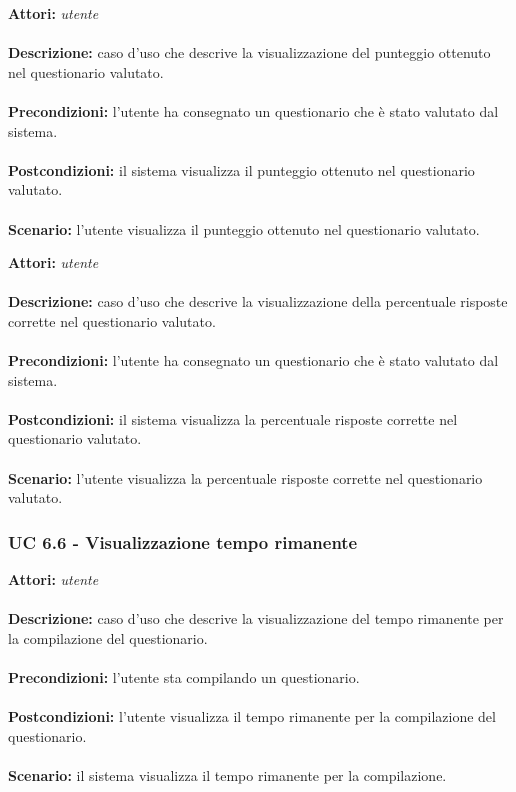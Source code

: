 \documentclass[a4paper,11pt]{article}
\begin{document}

\textbf{Attori:} \textit{utente}
\\ \\
\textbf{Descrizione:} caso d'uso che descrive la visualizzazione del punteggio ottenuto nel questionario valutato.\\
\\
\textbf{Precondizioni:} l'utente ha consegnato un questionario che è stato valutato dal sistema.\\
\\
\textbf{Postcondizioni:} il sistema visualizza il punteggio ottenuto nel questionario valutato.\\
\\
\textbf{Scenario:} l’utente visualizza il punteggio ottenuto nel questionario valutato.\\



\textbf{Attori:} \textit{utente}
\\ \\
\textbf{Descrizione:} caso d'uso che descrive la visualizzazione della percentuale risposte corrette nel questionario valutato.\\
\\
\textbf{Precondizioni:} l'utente ha consegnato un questionario che è stato valutato dal sistema.\\
\\
\textbf{Postcondizioni:} il sistema visualizza la percentuale risposte corrette nel questionario valutato.\\
\\
\textbf{Scenario:} l’utente visualizza la percentuale risposte corrette nel questionario valutato.\\


\subsubsection{UC 6.6 - Visualizzazione tempo rimanente}

\textbf{Attori:} \textit{utente}
\\ \\
\textbf{Descrizione:} caso d'uso che descrive la visualizzazione del tempo rimanente per la compilazione del questionario.\\
\\
\textbf{Precondizioni:} l'utente sta compilando un questionario.\\
\\
\textbf{Postcondizioni:} l'utente visualizza il tempo rimanente per la compilazione del questionario.\\
\\
\textbf{Scenario:} il sistema visualizza il tempo rimanente per la compilazione.\\
\end{document}
